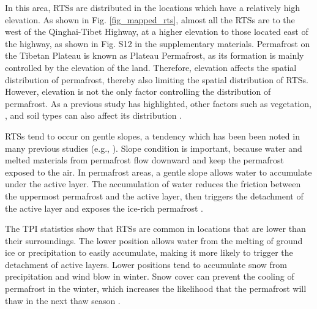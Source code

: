 \documentclass[authoryear,preprint,review,12pt]{elsarticle}
\begin{document}




In this area, RTSs are distributed in the locations which have a relatively high elevation.
As shown in Fig. \ref{fig_mapped_rts}, almost all the RTSs are to the west of the Qinghai-Tibet Highway, at a higher elevation to those located east of the highway, as shown in Fig. S12 in the supplementary materials. Permafrost on the Tibetan Plateau is known as Plateau Permafrost, as its formation is mainly controlled by the elevation of the land. Therefore, elevation affects the spatial distribution of permafrost, thereby also limiting the spatial distribution of RTSs. However, elevation is not the only factor controlling the distribution of permafrost. As a previous study has highlighted, other factors such as vegetation, , and soil types can also affect its distribution \citep{yin2017effects}.

RTSs tend to occur on gentle slopes, a tendency which has been been noted in many previous studies (e.g., \citealp{leibman1995cryogenic, niu2014thaw, lacelle_distribution_2015}). Slope condition is important, because water and melted materials from permafrost flow downward and keep the permafrost exposed to the air. In permafrost areas, a gentle slope allows water to accumulate under the active layer. The accumulation of water reduces the friction between the uppermost permafrost and the active layer,  then triggers the detachment of the active layer and exposes the ice-rich permafrost \citep{mcroberts1974stability, mcroberts1974the}. 

The TPI statistics show that RTSs are common in locations that are lower than their surroundings. The lower position allows water from the melting of ground ice or precipitation to easily accumulate, making it more likely to trigger the detachment of active layers. Lower positions tend to accumulate snow from precipitation and wind blow in winter. Snow cover can prevent the cooling of permafrost in the winter, which increases the likelihood that the permafrost will thaw in the next thaw season . 
\end{document}
